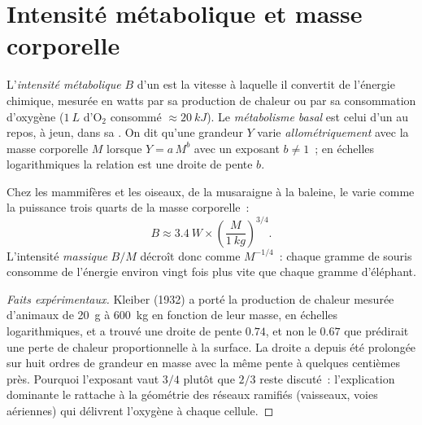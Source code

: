 \section{Intensité métabolique et masse corporelle}

\begin{definition}\label{def:b1:organism-environment:allometry}
L'\emph{intensité métabolique} $B$ d'un
 est la vitesse à laquelle il convertit de l'énergie chimique,
mesurée en watts par sa production de chaleur ou par sa consommation
d'oxygène ($\qty{1}{L}$ d'$\mathrm{O_2}$ consommé
$\approx \qty{20}{kJ}$). Le \emph{métabolisme
basal} est celui d'un  au repos, à
jeun, dans sa . On dit qu'une grandeur $Y$
varie \emph{allométriquement} avec la masse
corporelle $M$ lorsque $Y = a\,M^{b}$ avec un exposant $b \neq 1$~; en
échelles logarithmiques la relation est une droite de pente $b$.
\end{definition}

\begin{theorem}\label{thm:b1:organism-environment:kleiber}
Chez les mammifères et les oiseaux, de la musaraigne à la baleine, le
 varie comme la puissance trois quarts de la masse
corporelle~:
\[
B \approx \qty{3.4}{W}\times\left(\frac{M}{\qty{1}{kg}}\right)^{3/4}.
\]
L'intensité \emph{massique} $B/M$ décroît donc comme $M^{-1/4}$~: chaque
gramme de souris consomme de l'énergie environ vingt fois plus vite que
chaque gramme d'éléphant.
\end{theorem}
\begin{proof}[Faits expérimentaux]
Kleiber (1932) a porté la production de chaleur mesurée d'animaux de
\qty{20}{g} à \qty{600}{kg} en fonction de leur masse, en échelles
logarithmiques, et a trouvé une droite de pente $0.74$, et non le $0.67$
que prédirait une perte de chaleur proportionnelle à la surface. La
droite a depuis été prolongée sur huit ordres de grandeur en masse avec
la même pente à quelques centièmes près. Pourquoi l'exposant vaut $3/4$
plutôt que $2/3$ reste discuté~: l'explication dominante le rattache à
la géométrie des réseaux ramifiés (vaisseaux, voies aériennes) qui
délivrent l'oxygène à chaque cellule.
\end{proof}

